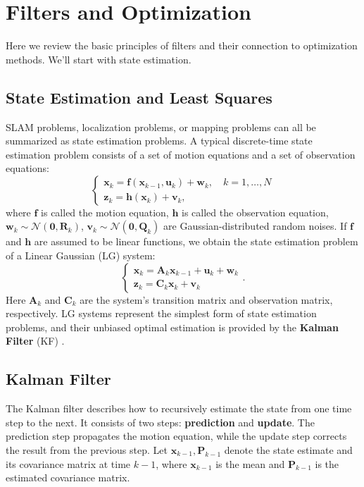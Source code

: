 \section{Filters and Optimization}
Here we review the basic principles of filters and their connection to optimization methods. We'll start with state estimation.

\subsection{State Estimation and Least Squares}
SLAM problems, localization problems, or mapping problems can all be summarized as state estimation problems. A typical discrete-time state estimation problem consists of a set of motion equations and a set of observation equations:
\begin{equation}
	\left\{ \begin{array}{l}
		{\mathbf{x}_k} = \mathbf{f}\left( {{\mathbf{x}_{k - 1}},{\mathbf{u}_k}} \right) + \mathbf{w}_k,\quad k=1, \ldots, N\\
		{\mathbf{z}_{k}} = \mathbf{h} \left( \mathbf{x}_k  \right)+ \mathbf{v}_{k},
	\end{array} \right.
\end{equation}
where $\mathbf{f}$ is called the motion equation, $\mathbf{h}$ is called the observation equation, $\mathbf{w}_k \sim \mathcal{N}(\mathbf{0}, \mathbf{R}_k)$, $\mathbf{v}_k 
\sim \mathcal{N}( \mathbf{0}, \mathbf{Q}_k)$ are Gaussian-distributed random noises. If $\mathbf{f}$ and $\mathbf{h}$ are assumed to be linear functions, we obtain the state estimation problem of a Linear Gaussian (LG) system:
\begin{equation}
	\left\{ \begin{array}{l}
		{\mathbf{x}_k} = \mathbf{A}_k {{\mathbf{x}_{k - 1}}+{\mathbf{u}_k}} + \mathbf{w}_k \\
		{\mathbf{z}_{k}} = \mathbf{C}_k  { \mathbf{x}_k} + \mathbf{v}_{k} \end{array} \right. .
\end{equation}
Here $\mathbf{A}_k$ and $\mathbf{C}_k$ are the system's transition matrix and observation matrix, respectively. LG systems represent the simplest form of state estimation problems, and their unbiased optimal estimation is provided by the \textbf{Kalman Filter} (KF) \cite{Zarchan2005,Barfoot2016}.

\subsection{Kalman Filter}
The Kalman filter describes how to recursively estimate the state from one time step to the next. It consists of two steps: \textbf{prediction} and \textbf{update}. The prediction step propagates the motion equation, while the update step corrects the result from the previous step. Let $\mathbf{x}_{k-1}, \mathbf{P}_{k-1}$ denote the state estimate and its covariance matrix at time $k-1$, where $\mathbf{x}_{k-1}$ is the mean and $\mathbf{P}_{k-1}$ is the estimated covariance matrix.


